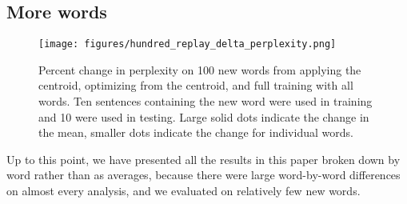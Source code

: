 \documentclass{article}
\begin{document}
\subsection{More words}
\begin{figure}[t]
\texttt{[image: figures/hundred\_replay\_delta\_perplexity.png]}
\caption{Percent change in perplexity on 100 new words from applying the centroid, optimizing from the centroid, and full training with all words. Ten sentences containing the new word were used in training and 10 were used in testing.  Large solid dots indicate the change in the mean, smaller dots indicate the change for individual words.}
\label{hundred_word_figure}
\end{figure}
Up to this point, we have presented all the results in this paper broken down by word rather than as averages, because there were large word-by-word differences on almost every analysis, and we evaluated on relatively few new words. %
\end{document}

